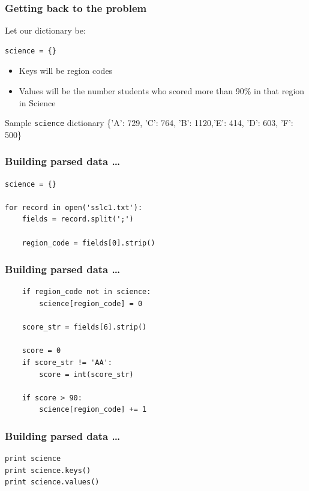 \documentclass[14pt,compress]{beamer}
\newcommand{\typ}[1]{\lstinline{#1}}
\begin{document}
\begin{frame}[fragile]
  \frametitle{Getting back to the problem}
  Let our dictionary be:
  \begin{lstlisting}
science = {}
  \end{lstlisting}
\begin{itemize}
    \item Keys will be region codes
    \item Values will be the number students who scored more than 90\% in that region in Science
  \end{itemize}
  \begin{block}{Sample \typ{science} dictionary}
    \{'A': 729, 'C': 764, 'B': 1120,'E': 414, 'D': 603, 'F': 500\}
  \end{block}

\end{frame}

\begin{frame}[fragile]
  \frametitle{Building parsed data \ldots}
  \begin{lstlisting}
science = {}

for record in open('sslc1.txt'):
    fields = record.split(';')

    region_code = fields[0].strip()
  \end{lstlisting}
\end{frame}

\begin{frame}[fragile]
  \frametitle{Building parsed data \ldots}
  \begin{lstlisting}
    if region_code not in science:
        science[region_code] = 0

    score_str = fields[6].strip()

    score = 0
    if score_str != 'AA':
        score = int(score_str)

    if score > 90:
        science[region_code] += 1
  \end{lstlisting}
\end{frame}

\begin{frame}[fragile]
  \frametitle{Building parsed data \ldots}
  \begin{lstlisting}
print science
print science.keys()
print science.values()
  \end{lstlisting}
\end{frame}
\end{document}
